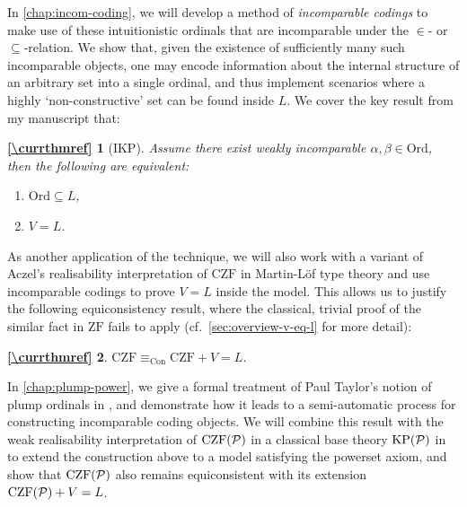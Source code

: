 \documentclass[12pt,openany]{book}
\theoremstyle{plain}
\newtheorem*{refthm}{\autoref{\currthmref}}
\theoremstyle{definition}
\newcommand\uplabel[1]{\textup{(#1)}}
\DeclareMathOperator\Con{Con}
\newcommand\Pow{\mathcal{P}}
\newcommand\KPP{\mathrm{KP}\mleft(\Pow\mright)}
\newcommand\CZF{\mathrm{CZF}}
\newcommand\CZFP{\mathrm{CZF}\mleft(\Pow\mright)}
\newcommand\IKP{\mathrm{IKP}}
\newcommand\ZF{\mathrm{ZF}}
\newcommand\Ord{\mathrm{Ord}}
\begin{document}
In \autoref{chap:incom-coding}, we will develop a method of \emph{incomparable codings} to make use of these intuitionistic ordinals that are incomparable under the $\in$- or $\subseteq$-relation. We show that, given the existence of sufficiently many such incomparable objects, one may encode information about the internal structure of an arbitrary set into a single ordinal, and thus implement scenarios where a highly `non-constructive' set can be found inside $L$. We cover the key result from my manuscript \cite{wang-sw25-antichain-pre} that:
\def\currthmref{thm:set-perp-v-eq-l-equiv}
\begin{refthm}[$\IKP$]
  Assume there exist weakly incomparable $\alpha, \beta \in \Ord$, then the following are equivalent:
  \begin{enumerate}[label=\uplabel{\roman*}]
    \item $\Ord \subseteq L$,
    \item $V = L$.
  \end{enumerate}
\end{refthm}

As another application of the technique, we will also work with a variant of Aczel's realisability interpretation of $\CZF$ in Martin-L\"of type theory \cite{aczel78-type-theoretic-cst} and use incomparable codings to prove $V = L$ inside the model. This allows us to justify the following equiconsistency result, where the classical, trivial proof of the similar fact in $\ZF$ fails to apply (cf.\ \autoref{sec:overview-v-eq-l} for more detail):
\def\currthmref{cor:czf-equi-v-eq-l}
\begin{refthm}
  $\CZF \equiv_{\Con} \CZF + V = L$.
\end{refthm}

In \autoref{chap:plump-power}, we give a formal treatment of Paul Taylor's notion of plump ordinals in \cite{taylor96-intuitionistic-ordinals}, and demonstrate how it leads to a semi-automatic process for constructing incomparable coding objects. We will combine this result with the weak realisability interpretation of $\CZFP$ in a classical base theory $\KPP$ in \cite{rathjen12-czf-powerset} to extend the construction above to a model satisfying the powerset axiom, and show that $\CZFP$ also remains equiconsistent with its extension $\CZFP + V = L$.
\end{document}
